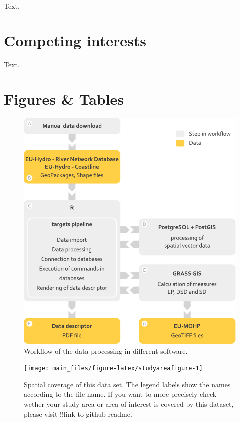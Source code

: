 \documentclass[fleqn,10pt]{wlscirep}
\begin{document}
Text.

\hypertarget{competing-interests}{%
\section*{Competing interests}\label{competing-interests}}

Text.

\hypertarget{figures-tables}{%
\section*{Figures \& Tables}\label{figures-tables}}

\begin{figure}[H]

{\centering \includegraphics[width=0.7\linewidth]{diagramms/workflow_figure} 

}

\caption{Workflow of the data processing in different software.}\label{fig:workflowfigure}
\end{figure}

\begin{figure}[H]

{\centering \texttt{[image: main\_files/figure-latex/studyareafigure-1]} 

}

\caption{Spatial coverage of this data set. The legend labels show the names according to the file name. If you want to more precisely check wether your study area or area of interest is covered by this dataset, please visit !!link to github readme.}\label{fig:studyareafigure}
\end{figure}
\end{document}
